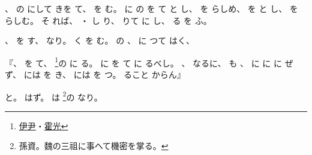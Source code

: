 \documentclass[a4paper,12pt]{article}
\begin{document}
%
、%
の%
にして%
%
きを%
て、%
を%
む。%
に%
の%
%
を%
て%
と%
し、%
を%
らしめ、%
を%
と%
し、%
を%
らしむ。%
そ%
%
れば、%
・%
し%
り、%
りて%
に%
し、%
る%
%
を%
ふ。%

%
、%
を%
す、%
なり。%
%
く%
を%
む。%
の%
%
、%
に%
つて%
はく、%
\begin{quoting}
『、%
を%
て、%
\footnote{\href{https://kotobank.jp/word/\%E4\%BC\%8A\%E5\%B0\%B9-430584\#E4.B8.96.E7.95.8C.E5.A4.A7.E7.99.BE.E7.A7.91.E4.BA.8B.E5.85.B8.20.E7.AC.AC.EF.BC.92.E7.89.88}{伊尹}・\href{https://kotobank.jp/word/\%E9\%9C\%8D\%E5\%85\%89-43591\#E6.97.A5.E6.9C.AC.E5.A4.A7.E7.99.BE.E7.A7.91.E5.85.A8.E6.9B.B8.28.E3.83.8B.E3.83.83.E3.83.9D.E3.83.8B.E3.82.AB.29}{霍光}}の%
に%
る。%
に%
%
%
を%
て%
に%
るべし。%
、%
%
なるに、%
も%
、%
に%
に%
に%
ぜず、%
には%
を%
き、%
には%
を%
つ。%
%
ること%
%
からん』
\end{quoting}
と。%
%
はず。%
は%
\footnote{孫資。魏の三祖に事へて機密を掌る。}の%
なり。%
\end{document}
